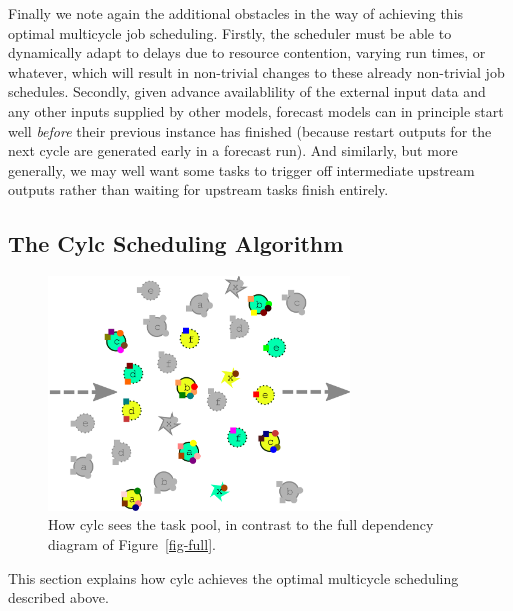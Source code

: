 \documentclass[11pt,a4paper]{article}
\begin{document}
Finally we note again the additional obstacles in the way of achieving
this optimal multicycle job scheduling. Firstly, the scheduler must be
able to dynamically adapt to delays due to resource contention, varying
run times, or whatever, which will result in non-trivial changes to
these already non-trivial job schedules. Secondly, given advance
availablility of the external input data and any other inputs supplied
by other models, forecast models can in principle start well {\em
before} their previous instance has finished (because restart outputs
for the next cycle are generated early in a forecast run). And
similarly, but more generally, we may well want some tasks to trigger
off intermediate upstream outputs rather than waiting for upstream tasks
finish entirely. 


\subsection{The Cylc Scheduling Algorithm} 
\label{TheCylcSchedulingAlgorithm}

\begin{figure} \label{fig-task-pool}
    \begin{center} 
        \includegraphics[width=8cm]{inkscape-svg/task-pool}
    \end{center} 
    \caption[The cylc task pool]{\small How cylc sees the task pool, in
    contrast to the full dependency diagram of Figure~\ref{fig-full}.} 
\end{figure} 

This section explains how cylc achieves the optimal multicycle
scheduling described above. 
\end{document}
